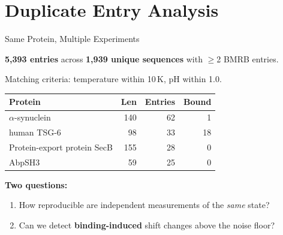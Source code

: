 \documentclass[aspectratio=169,11pt]{beamer}
\begin{document}
\section{Duplicate Entry Analysis}

\begin{frame}[shrink=5]{Same Protein, Multiple Experiments}

\textbf{5,393 entries} across \textbf{1,939 unique sequences} with $\geq$2 BMRB entries.

\medskip
Matching criteria: temperature within 10\,K, pH within 1.0.

\medskip
\begin{center}
\footnotesize
\begin{tabular}{lrrr}
\toprule
\textbf{Protein} & \textbf{Len} & \textbf{Entries} & \textbf{Bound} \\
\midrule
$\alpha$-synuclein             & 140 & 62 &  1 \\
human TSG-6                    &  98 & 33 & 18 \\
Protein-export protein SecB    & 155 & 28 &  0 \\
AbpSH3                         &  59 & 25 &  0 \\
\bottomrule
\end{tabular}
\end{center}

\medskip
\textbf{Two questions:}
\begin{enumerate}
  \item How reproducible are independent measurements of the \emph{same} state?
  \item Can we detect \textbf{binding-induced} shift changes above the noise floor?
\end{enumerate}
\end{frame}
\end{document}
